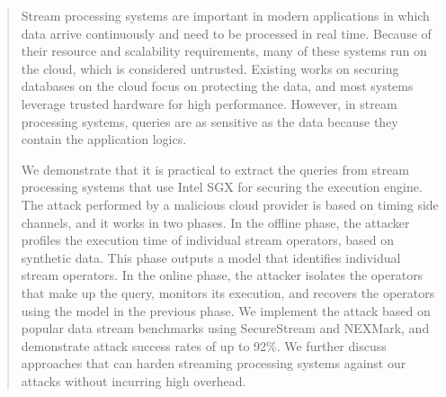 \begin{abstract}
Stream processing systems are important in modern applications in which data arrive continuously and need to be processed in real time. Because of their resource and scalability requirements, many of these systems run on the cloud, which is considered untrusted. Existing works on securing databases on the cloud focus on protecting the data, and most
systems leverage trusted hardware for high performance. However, in stream processing systems, queries are as sensitive as the data because they contain the application logics.  

We demonstrate that it is practical to extract the queries from stream processing systems that use Intel SGX for securing the execution engine. The attack performed by a malicious cloud provider is based on timing side channels, and it works in two phases. In the offline phase, the attacker profiles the execution time of individual stream operators,
based on synthetic data. This phase outputs a model that identifies individual stream operators.  In the online phase, the attacker isolates the operators that make up the query, monitors its execution, and recovers the operators using the
model in the previous phase. We implement the attack based on popular data stream benchmarks using SecureStream and NEXMark, and demonstrate attack success rates of up to 92\%. We further discuss approaches that can harden streaming processing systems against our attacks without incurring high overhead.
 
\end{abstract}
